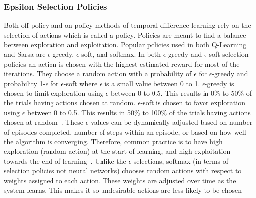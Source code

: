 \documentclass[12pt,american]{report}
\begin{document}
        \subsubsection{Epsilon Selection Policies}
        Both off-policy and on-policy methods of temporal difference learning rely on the selection of actions which is called a policy.  Policies are meant to find a balance between exploration and exploitation. Popular policies used in both Q-Learning and Sarsa are \begin{math}\epsilon\end{math}-greedy, \begin{math}\epsilon\end{math}-soft, and softmax.  In both \begin{math}\epsilon\end{math}-greedy and \begin{math}\epsilon\end{math}-soft selection policies an action is chosen with the highest estimated reward for most of the iterations. They choose a random action with a probability of \begin{math}\epsilon\end{math} for \begin{math}\epsilon\end{math}-greedy and probability 1-\begin{math}\epsilon\end{math} for \begin{math}\epsilon\end{math}-soft where \begin{math}\epsilon\end{math} is a small value between 0 to 1. \begin{math}\epsilon\end{math}-greedy is chosen to limit exploration using \begin{math}\epsilon\end{math} between 0 to 0.5. This results in 0\% to 50\% of the trials having actions chosen at random.  \begin{math}\epsilon\end{math}-soft is chosen to favor exploration using \begin{math}\epsilon\end{math} between 0 to 0.5. This results in 50\% to 100\% of the trials having actions chosen at random~\cite{Eden}. These $\epsilon$ values can be dynamically adjusted based on number of episodes completed, number of steps within an episode, or based on how well the algorithm is converging.  Therefore, common practice is to have high exploration (random action) at the start of learning, and high exploitation towards the end of learning~\cite{Greedy}.  Unlike the \begin{math}\epsilon\end{math} selections, softmax (in terms of selection policies not neural networks) chooses random actions with respect to weights assigned to each action. These weights are adjusted over time as the system learns. This makes it so undesirable actions are less likely to be chosen 
\end{document}
